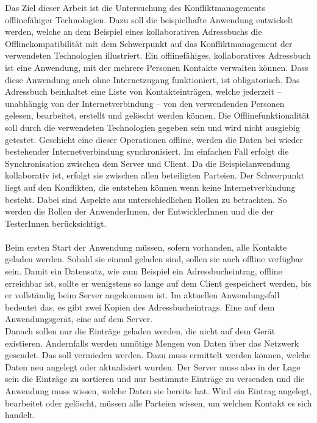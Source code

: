 Das Ziel dieser Arbeit ist die Untersuchung des Konfliktmanagements offlinefähiger Technologien.
Dazu soll die beispielhafte Anwendung entwickelt werden, welche an dem Beispiel eines kollaborativen Adressbuchs die Offlinekompatibilität mit dem Schwerpunkt auf das Konfliktmanagement der verwendeten Technologien illustriert.
Ein offlinefähiges, kollaboratives Adressbuch ist eine Anwendung, mit der mehrere Personen Kontakte verwalten können.
Dass diese Anwendung auch ohne Internetzugang funktioniert, ist obligatorisch.
Das Adressbuch beinhaltet eine Liste von Kontakteinträgen, welche jederzeit -- unabhängig von der Internetverbindung -- von den verwendenden Personen gelesen, bearbeitet, erstellt und gelöscht werden können.
Die Offlinefunktionalität soll durch die verwendeten Technologien gegeben sein und wird nicht ausgiebig getestet.
Geschieht eine dieser Operationen offline, werden die Daten bei wieder bestehender Internetverbindung synchronisiert. Im einfachen Fall erfolgt die Synchronisation zwischen dem Server und Client.
Da die Beispielanwendung kollaborativ ist, erfolgt sie zwischen allen beteiligten Parteien.
Der Schwerpunkt liegt auf den Konflikten, die entstehen können wenn keine Internetverbindung besteht.
Dabei sind Aspekte aus unterschiedlichen Rollen zu betrachten. So werden die Rollen der AnwenderInnen, der EntwicklerInnen und die der TesterInnen berücksichtigt.\\\\
%
%
Beim ersten Start der Anwendung müssen, sofern vorhanden, alle Kontakte geladen werden. Sobald sie einmal geladen sind, sollen sie auch offline verfügbar sein.
Damit ein Datensatz, wie zum Beispiel ein Adressbucheintrag, offline erreichbar ist, sollte er wenigstens so lange auf dem Client gespeichert werden, bis er vollständig beim Server angekommen ist.
Im aktuellen Anwendungsfall bedeutet das, es gibt zwei Kopien des Adressbucheintrags. Eine auf dem Anwendungsgerät, eine auf dem Server.\\
Danach sollen nur die Einträge geladen werden, die nicht auf dem Gerät existieren.
Andernfalls werden unnötige Mengen von Daten über das Netzwerk gesendet. Das soll vermieden werden.
Dazu muss ermittelt werden können, welche Daten neu angelegt oder aktualisiert wurden.
Der Server muss also in der Lage sein die Einträge zu sortieren und nur bestimmte Einträge zu versenden und die Anwendung muss wissen, welche Daten sie bereits hat. Wird ein Eintrag angelegt, bearbeitet oder gelöscht, müssen alle Parteien wissen, um welchen Kontakt es sich handelt.
